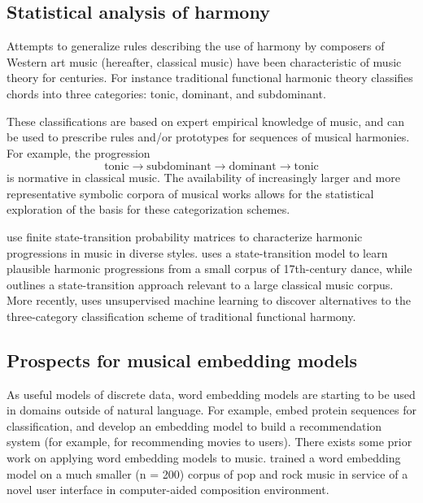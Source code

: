 \subsection{Statistical analysis of harmony}

Attempts to generalize rules describing the use of harmony by composers of Western art music (hereafter, classical music) have been characteristic of music theory for centuries. For instance traditional functional harmonic theory classifies chords into three categories: tonic, dominant, and subdominant. 

These classifications are based on expert empirical knowledge of music, and can be used to prescribe rules and/or prototypes for sequences of musical harmonies. For example, the progression
$$\textrm{tonic} \xrightarrow{} \textrm{subdominant} \xrightarrow{} \textrm{dominant} \xrightarrow{} \textrm{tonic}$$
is normative in classical music. The availability of increasingly larger and more representative symbolic corpora of musical works allows for the statistical exploration of the basis for these categorization schemes.

\cite{nichols_data-driven_2009, temperley_statistical_2013} use finite state-transition probability matrices to characterize harmonic progressions in music in diverse styles. \cite{Ponsford99} uses a state-transition model to learn plausible harmonic progressions from a small corpus of 17th-century dance, while \cite{collins_corpus-sensitive_2015} outlines a state-transition approach relevant to a large classical music corpus. More recently, \cite{White2013} uses unsupervised machine learning to discover alternatives to the three-category classification scheme of traditional functional harmony.

\subsection{Prospects for musical embedding models}

As useful models of discrete data, word embedding models are starting to be used in domains outside of natural language. For example, \cite{Asgari2015} embed protein sequences for classification, and \cite{Guardia-Sebaoun2015} develop an embedding model to build a recommendation system (for example, for recommending movies to users). There exists some prior work on applying word embedding models to music. \cite{Huang2016} trained a word embedding model on a much smaller (n = 200) corpus of pop and rock music in service of a novel user interface in computer-aided composition environment. 


